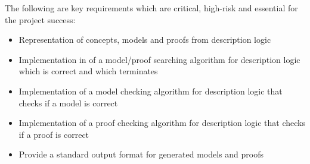 The following are key requirements which are critical, high-risk and essential for the project success:

\begin{itemize}
\item Representation of concepts, models and proofs from description logic
\item Implementation in of a model/proof searching algorithm for description logic which is correct and which terminates
\item Implementation of a model checking algorithm for description logic that checks
if a model is correct
\item Implementation of a proof checking algorithm for description logic that checks if a proof is correct
\item Provide a standard output format for generated models and proofs 
\end{itemize}

